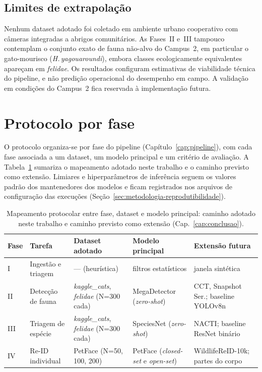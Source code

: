 \subsection*{Limites de extrapolação}

Nenhum dataset adotado foi coletado em ambiente urbano cooperativo com câmeras integradas a abrigos comunitários. As Fases~II e~III tampouco contemplam o conjunto exato de fauna não-alvo do Campus~2, em particular o gato-mourisco (\textit{H.\,yagouaroundi}), embora classes ecologicamente equivalentes apareçam em \textit{felidae}. Os resultados configuram estimativas de viabilidade técnica do pipeline, e não predição operacional do desempenho em campo. A validação em condições do Campus~2 fica reservada à implementação futura.

\section{Protocolo por fase}
\label{sec:metodologia-protocolo}

O protocolo organiza-se por fase do pipeline (Capítulo~\ref{cap:pipeline}), com cada fase associada a um dataset, um modelo principal e um critério de avaliação. A Tabela~\ref{tab:mapeamento-protocolar} sumariza o mapeamento adotado neste trabalho e o caminho previsto como extensão. Limiares e hiperparâmetros de inferência seguem os valores padrão dos mantenedores dos modelos e ficam registrados nos arquivos de configuração das execuções (Seção~\ref{sec:metodologia-reprodutibilidade}).

\begin{table}[!htb]
\centering
\caption[Mapeamento protocolar entre fase, dataset e modelo.]{Mapeamento protocolar entre fase, dataset e modelo principal: caminho adotado neste trabalho e caminho previsto como extensão (Cap.~\ref{cap:conclusao}).}
\label{tab:mapeamento-protocolar}
\small
\begin{tabular}{@{}p{0.8cm} p{3.0cm} p{3.6cm} p{3.4cm} p{2.6cm}@{}}
\toprule
\textbf{Fase} & \textbf{Tarefa} & \textbf{Dataset adotado} & \textbf{Modelo principal} & \textbf{Extensão futura} \\
\midrule
I  & Ingestão e triagem & --- (heurística) & filtros estatísticos & janela sintética \\
\addlinespace[2pt]
II & Detecção de fauna & \textit{kaggle\_cats}, \textit{felidae} (N=300 cada) & MegaDetector (\textit{zero-shot}) & CCT, Snapshot Ser.; baseline YOLOv8n \\
\addlinespace[2pt]
III & Triagem de espécie & \textit{kaggle\_cats}, \textit{felidae} (N=300 cada) & SpeciesNet (\textit{zero-shot}) & NACTI; baseline ResNet binário \\
\addlinespace[2pt]
IV & Re-ID individual & PetFace (N=50, 100, 200) & PetFace (\textit{closed-set} e \textit{open-set}) & WildlifeReID-10k; partes do corpo \\
\bottomrule
\end{tabular}

\end{table}

